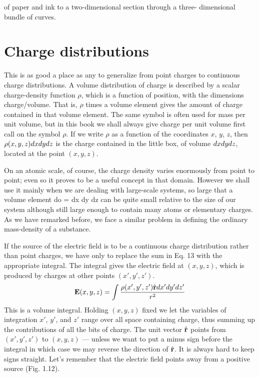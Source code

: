 of paper and ink to a two-dimensional section through a three-
dimensional bundle of curves.

\section{Charge distributions}

This is as good a place as any to generalize from point charges to
continuous charge distributions. A volume distribution of charge is
described by a scalar charge-density function $\rho$, which is a function
of position, with the dimensions charge/volume. That is, $\rho$ times a
volume element gives the amount of charge contained in that volume
element. The same symbol is often used for mass per unit volume,
but in this book we shall always give charge per unit volume first
call on the symbol $\rho$. If we write $\rho$ as a function of the coordinates
$x$, $y$, $z$, then $\rho(x,y,z)d x d y d z$ is the charge contained in the little box,
of volume $d x d y d z$, located at the point $(x,y,z)$.

On an atomic scale, of course, the charge density varies enormously
from point to point; even so it proves to be a useful concept
in that domain. However we shall use it mainly when we are dealing
with large-scale systems, so large that a volume element do =
dx dy dz can be quite small relative to the size of our system although
still large enough to contain many atoms or elementary charges.
As we have remarked before, we face a similar problem in defining
the ordinary mass-density of a substance.

If the source of the electric field is to be a continuous charge distribution
rather than point charges, we have only to replace the sum
in Eq. 13 with the appropriate integral. The integral gives the electric
field at $(x,y,z)$, which is produced by charges at other points
$(x',y',z')$.
\begin{equation}
  \mathbf{E}(x,y,z) = \int \frac{\rho(x',y',z')\hat{\mathbf{r}}d x' d y' d z'}{r^2}
\end{equation}
This is a volume integral. Holding $(x,y,z)$ fixed we let the variables
of integration $x'$, $y'$, and $z'$ range over all space containing charge,
thus summing up the contributions of all the bits of charge. The
unit vector $\hat{\mathbf{r}}$ points from $(x', y', z')$ to $(x,y,z)$ --- 
unless we want to put
a minus sign before the integral in which case we may reverse the
direction of $\hat{\mathbf{r}}$. It is always hard to keep signs straight. Let's remember
that the electric field points away from a positive source
(Fig. 1.12).


